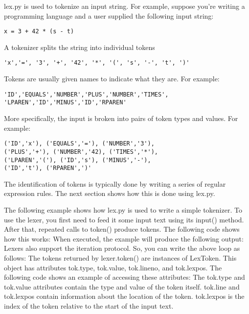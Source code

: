 \secdown

lex.py is used to tokenize an input string. For example, suppose you're writing
a programming language and a user supplied the following input string:
\begin{verbatim}
x = 3 + 42 * (s - t)
\end{verbatim}
A tokenizer splits the string into individual tokens
\begin{verbatim}
'x','=', '3', '+', '42', '*', '(', 's', '-', 't', ')'
\end{verbatim}
Tokens are usually given names to indicate what they are. For example:
\begin{verbatim}
'ID','EQUALS','NUMBER','PLUS','NUMBER','TIMES',
'LPAREN','ID','MINUS','ID','RPAREN'
\end{verbatim}
More specifically, the input is broken into pairs of token types and values. For
example:
\begin{verbatim}
('ID','x'), ('EQUALS','='), ('NUMBER','3'), 
('PLUS','+'), ('NUMBER','42), ('TIMES','*'),
('LPAREN','('), ('ID','s'), ('MINUS','-'),
('ID','t'), ('RPAREN',')'
\end{verbatim}
The identification of tokens is typically done by writing a series of regular
expression rules. The next section shows how this is done using lex.py.


The following example shows how lex.py is used to write a simple tokenizer.
To use the lexer, you first need to feed it some input text using its input()
method. After that, repeated calls to token() produce tokens. The following code
shows how this works:
When executed, the example will produce the following output:
Lexers also support the iteration protocol. So, you can write the above loop as
follows:
The tokens returned by lexer.token() are instances of LexToken. This object has
attributes tok.type, tok.value, tok.lineno, and tok.lexpos. The following code
shows an example of accessing these attributes:
The tok.type and tok.value attributes contain the type and value of the token
itself. tok.line and tok.lexpos contain information about the location of the
token. tok.lexpos is the index of the token relative to the start of the input
text.



